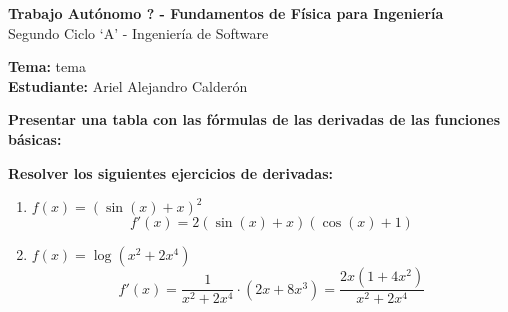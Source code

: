 \documentclass[answers]{exam} %
\begin{document}
\begin{center}
    \large\textbf{Trabajo Autónomo ? - Fundamentos de Física para Ingeniería}\\[1em]
    \large Segundo Ciclo \enquote*{A} - Ingeniería de Software\\[1em]
\end{center}

\vspace{0.5cm}
\noindent
\large\textbf{Tema:} tema \\
\large\textbf{Estudiante:} Ariel Alejandro Calderón
\vspace{0.5cm}

\begin{questions}

    \question \large\textbf{Presentar una tabla con las fórmulas de las derivadas de las funciones básicas:}


    \vspace{0.5cm}

    \question \large\textbf{Resolver los siguientes ejercicios de derivadas: }

    \begin{enumerate}[label=\alph*.]
        \item $\displaystyle f(x)=(\sin(x) + x)^2$
              \[
                  f'(x) = 2(\sin(x) + x)(\cos(x) + 1)
              \]

        \item $\displaystyle f(x)=\log(x^2 + 2x^4)$
              \[
                  f'(x) = \frac{1}{x^2 + 2x^4} \cdot (2x + 8x^3) = \frac{2x(1 + 4x^2)}{x^2 + 2x^4}
              \] 
    \end{enumerate}
    \vspace{0.5cm}
\end{questions}
\end{document}
